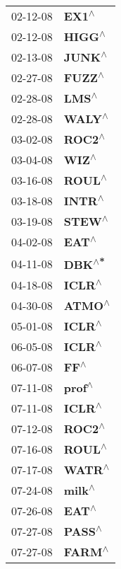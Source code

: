 \begin{supertabular}{p{0.08\textwidth}p{0.2\textwidth}}
 02-12-08 &     \textbf{EX1\textsuperscript{$\wedge$}} \\
 02-12-08 &    \textbf{HIGG\textsuperscript{$\wedge$}} \\
 02-13-08 &    \textbf{JUNK\textsuperscript{$\wedge$}} \\
 02-27-08 &    \textbf{FUZZ\textsuperscript{$\wedge$}} \\
 02-28-08 &     \textbf{LMS\textsuperscript{$\wedge$}} \\
 02-28-08 &    \textbf{WALY\textsuperscript{$\wedge$}} \\
 03-02-08 &    \textbf{ROC2\textsuperscript{$\wedge$}} \\
 03-04-08 &     \textbf{WIZ\textsuperscript{$\wedge$}} \\
 03-16-08 &    \textbf{ROUL\textsuperscript{$\wedge$}} \\
 03-18-08 &    \textbf{INTR\textsuperscript{$\wedge$}} \\
 03-19-08 &    \textbf{STEW\textsuperscript{$\wedge$}} \\
 04-02-08 &     \textbf{EAT\textsuperscript{$\wedge$}} \\
 04-11-08 &    \textbf{DBK\textsuperscript{$\wedge$*}} \\
 04-18-08 &    \textbf{ICLR\textsuperscript{$\wedge$}} \\
 04-30-08 &    \textbf{ATMO\textsuperscript{$\wedge$}} \\
 05-01-08 &    \textbf{ICLR\textsuperscript{$\wedge$}} \\
 06-05-08 &    \textbf{ICLR\textsuperscript{$\wedge$}} \\
 06-07-08 &      \textbf{FF\textsuperscript{$\wedge$}} \\
 07-11-08 &    \textbf{prof\textsuperscript{$\wedge$}} \\
 07-11-08 &    \textbf{ICLR\textsuperscript{$\wedge$}} \\
 07-12-08 &    \textbf{ROC2\textsuperscript{$\wedge$}} \\
 07-16-08 &    \textbf{ROUL\textsuperscript{$\wedge$}} \\
 07-17-08 &    \textbf{WATR\textsuperscript{$\wedge$}} \\
 07-24-08 &    \textbf{milk\textsuperscript{$\wedge$}} \\
 07-26-08 &     \textbf{EAT\textsuperscript{$\wedge$}} \\
 07-27-08 &    \textbf{PASS\textsuperscript{$\wedge$}} \\
 07-27-08 &    \textbf{FARM\textsuperscript{$\wedge$}} \\

\end{supertabular}
